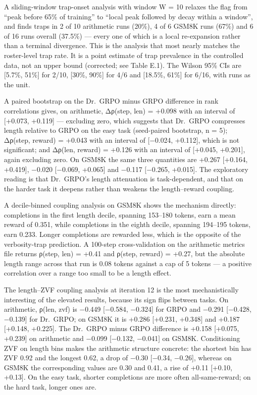 \documentclass[12pt,a4paper]{report}
\begin{document}
A sliding-window trap-onset analysis with window W = 10 relaxes the flag
from ``peak before 65\% of training'' to ``local peak followed by decay
within a window'', and finds traps in 2 of 10 arithmetic runs (20\%), 4
of 6 GSM8K runs (67\%) and 6 of 16 runs overall (37.5\%) --- every one
of which is a local re-expansion rather than a terminal divergence. This
is the analysis that most nearly matches the roster-level trap rate. It
is a point estimate of trap prevalence in the controlled data, not an
upper bound (corrected; see Table E.1). The Wilson 95\% CIs are
{[}5.7\%, 51\%{]} for 2/10, {[}30\%, 90\%{]} for 4/6 and {[}18.5\%,
61\%{]} for 6/16, with runs as the unit.

A paired bootstrap on the Dr.~GRPO minus GRPO difference in rank
correlations gives, on arithmetic, Δρ(step, len) = +0.098 with an
interval of {[}+0.073, +0.119{]} --- excluding zero, which suggests that
Dr.~GRPO compresses length relative to GRPO on the easy task
(seed-paired bootstrap, n = 5); Δρ(step, reward) = +0.043 with an
interval of {[}−0.024, +0.112{]}, which is not significant; and Δρ(len,
reward) = +0.126 with an interval of {[}+0.045, +0.201{]}, again
excluding zero. On GSM8K the same three quantities are +0.267 {[}+0.164,
+0.419{]}, −0.020 {[}−0.069, +0.065{]} and −0.117 {[}−0.265, +0.015{]}.
The exploratory reading is that Dr.~GRPO's length attenuation is
task-dependent, and that on the harder task it deepens rather than
weakens the length--reward coupling.

A decile-binned coupling analysis on GSM8K shows the mechanism directly:
completions in the first length decile, spanning 153--180 tokens, earn a
mean reward of 0.351, while completions in the eighth decile, spanning
194--195 tokens, earn 0.233. Longer completions are rewarded less, which
is the opposite of the verbosity-trap prediction. A 100-step
cross-validation on the arithmetic metrics file returns ρ(step, len) =
+0.41 and ρ(step, reward) = +0.27, but the absolute length range across
that run is 0.08 tokens against a cap of 5 tokens --- a positive
correlation over a range too small to be a length effect.

The length--ZVF coupling analysis at iteration 12 is the most
mechanistically interesting of the elevated results, because its sign
flips between tasks. On arithmetic, ρ(len, zvf) is −0.449 {[}−0.584,
−0.324{]} for GRPO and −0.291 {[}−0.428, −0.139{]} for Dr.~GRPO; on
GSM8K it is +0.286 {[}+0.231, +0.348{]} and +0.187 {[}+0.148, +0.225{]}.
The Dr.~GRPO minus GRPO difference is +0.158 {[}+0.075, +0.239{]} on
arithmetic and −0.099 {[}−0.132, −0.041{]} on GSM8K. Conditioning ZVF on
length bins makes the arithmetic structure concrete: the shortest bin
has ZVF 0.92 and the longest 0.62, a drop of −0.30 {[}−0.34, −0.26{]},
whereas on GSM8K the corresponding values are 0.30 and 0.41, a rise of
+0.11 {[}+0.10, +0.13{]}. On the easy task, shorter completions are more
often all-same-reward; on the hard task, longer ones are.
\end{document}
